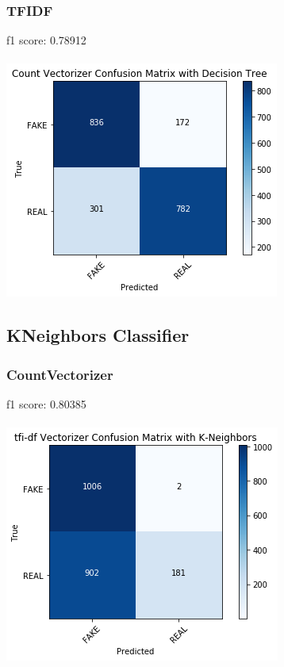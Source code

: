 \documentclass[twoside,twocolumn]{article}
\begin{document}
    \subsubsection{TFIDF}
    f1 score: 0.78912\\
    \\ \noindent \includegraphics[scale=0.6]{figures/tree_tfidf.png}

    \subsection{KNeighbors Classifier}
    \subsubsection{CountVectorizer}
    f1 score: 0.80385\\
    \\ \noindent \includegraphics[scale=0.6]{figures/knn_count.png}
\end{document}
